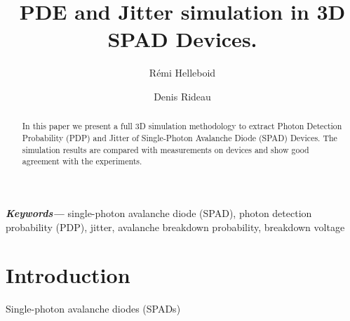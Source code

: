 \documentclass[12pt,a4paper,twocolumn]{article}
\title{PDE and Jitter simulation in 3D SPAD Devices.}
\author[1]{Rémi Helleboid}
\author[1]{Denis Rideau}
\affil[1]{ST Microelectronics, Crolles, France}
\date{}                     %
\providecommand{\keywords}[1]
{
  \small	
  \textbf{\textit{Keywords---}} #1
}
\begin{document}
\maketitle

\begin{abstract}
In this paper we present a full 3D simulation methodology to extract Photon Detection Probability (PDP) and Jitter of Single-Photon Avalanche Diode (SPAD) Devices. The simulation results are compared with measurements on devices and show good agreement with the experiments.\\
\end{abstract}

\keywords{single-photon avalanche diode (SPAD), photon detection probability (PDP), jitter, avalanche breakdown probability, breakdown voltage}

\section{Introduction}
Single-photon avalanche diodes (SPADs) 
\end{document}
